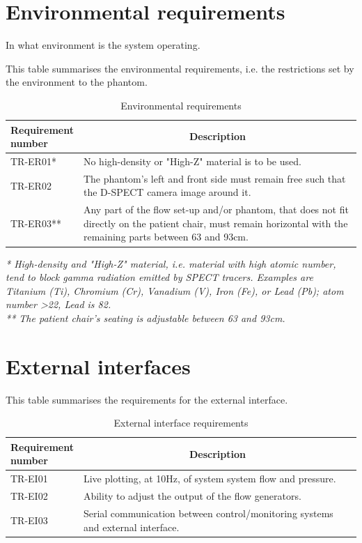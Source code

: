 \section{Environmental requirements}
In what environment is the system operating.
\begin{table} [H]
\caption{Environmental requirements}
\label{tab:envirreq}
This table summarises the environmental requirements, i.e. the restrictions set by the environment to the phantom.
\begin{tabular}{l|p{120mm}|}
	\makecell[l]{\textbf{Requirement} \\ \textbf{number}} & \multicolumn{1}{c}{\textbf{Description}}\\
	\hline
	TR-ER01* &  No high-density or "High-Z" material is to be used.\\ 
	TR-ER02 & The phantom's left and front side must remain free such that the D-SPECT camera image around it. \\ 
	TR-ER03** & Any part of the flow set-up and/or phantom, that does not fit directly on the patient chair, must remain horizontal with the remaining parts between 63 and 93cm. \\
	\cline{2-2}
\end{tabular}
\raggedright
\textit{* High-density and "High-Z" material, i.e. material with high atomic number, tend to block gamma radiation emitted by \ac{SPECT} tracers. Examples are Titanium (Ti), Chromium (Cr), Vanadium (V), Iron (Fe), or Lead (Pb); atom number \textgreater 22, Lead is 82.} \\
\textit{** The patient chair's seating is adjustable between 63 and 93cm.}
\end{table}

\section{External interfaces}
\begin{table} [H]
\caption{External interface requirements}
\label{tab:exint}
This table summarises the requirements for the external interface.
\begin{tabular}{l|p{120mm}|}
	\makecell[l]{\textbf{Requirement} \\ \textbf{number}} & \multicolumn{1}{c}{\textbf{Description}}\\
	\hline
	TR-EI01 &  Live plotting, at 10Hz, of system system flow and pressure.\\
	TR-EI02 & Ability to adjust the output of the flow generators. \\
	TR-EI03 & Serial communication between control/monitoring systems and external interface.\\
	\cline{2-2}
\end{tabular}
\end{table}

